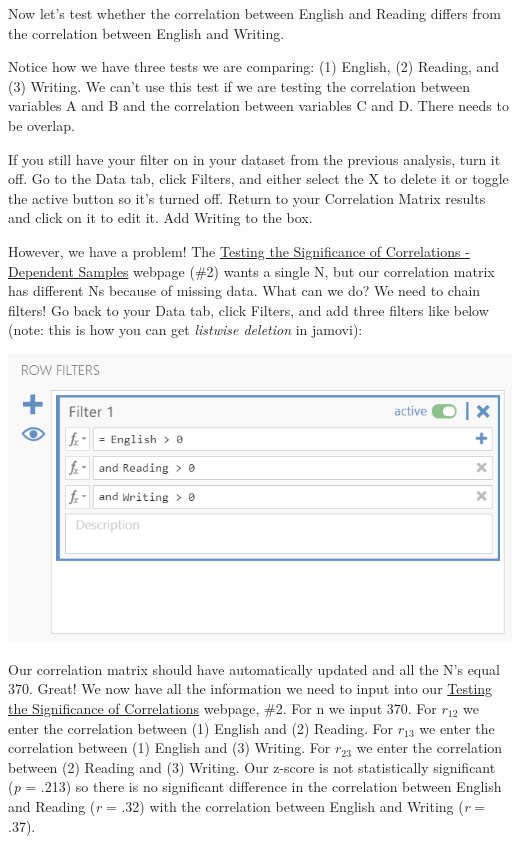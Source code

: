 \documentclass[
]{book}
\begin{document}
Now let's test whether the correlation between English and Reading differs from the correlation between English and Writing.

Notice how we have three tests we are comparing: (1) English, (2) Reading, and (3) Writing. We can't use this test if we are testing the correlation between variables A and B and the correlation between variables C and D. There needs to be overlap.

If you still have your filter on in your dataset from the previous analysis, turn it off. Go to the Data tab, click Filters, and either select the X to delete it or toggle the active button so it's turned off. Return to your Correlation Matrix results and click on it to edit it. Add Writing to the box.

However, we have a problem! The \href{https://www.psychometrica.de/correlation.html\#dependent}{Testing the Significance of Correlations - Dependent Samples} webpage (\#2) wants a single N, but our correlation matrix has different Ns because of missing data. What can we do? We need to chain filters! Go back to your Data tab, click Filters, and add three filters like below (note: this is how you can get \emph{listwise deletion} in jamovi):

\includegraphics{images/08-correlation/correlation-filters.png}

Our correlation matrix should have automatically updated and all the N's equal 370. Great! We now have all the information we need to input into our \href{https://www.psychometrica.de/correlation.html}{Testing the Significance of Correlations} webpage, \#2. For n we input 370. For \(r_{12}\) we enter the correlation between (1) English and (2) Reading. For \(r_{13}\) we enter the correlation between (1) English and (3) Writing. For \(r_{23}\) we enter the correlation between (2) Reading and (3) Writing. Our z-score is not statistically significant (\emph{p} = .213) so there is no significant difference in the correlation between English and Reading (\emph{r} = .32) with the correlation between English and Writing (\emph{r} = .37).
\end{document}
